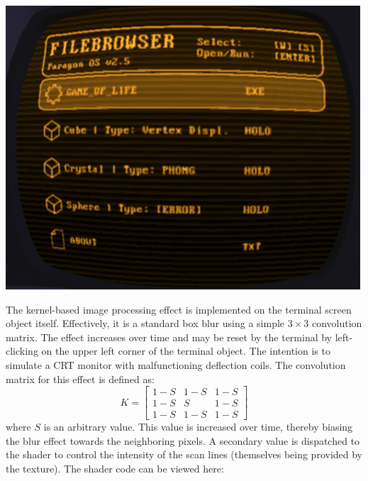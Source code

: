 \documentclass[11pt]{article}
\begin{document}
\begin{center}
	\includegraphics[width=0.5\linewidth]{screeneffect.png}
\end{center}
The kernel-based image processing effect is implemented on the terminal screen object itself. Effectively, it is a standard box blur using a simple $3 \times 3$ convolution matrix. The effect increases over time and may be reset by  the terminal by left-clicking on the upper left corner of the terminal object. The intention is to simulate a CRT monitor with malfunctioning deflection coils. The convolution matrix for this effect is defined as:
\[ K = \begin{bmatrix} 1-S & 1-S & 1-S \\ 1-S & S & 1-S \\ 1-S & 1-S & 1-S \end{bmatrix} \] where $S$ is an arbitrary  value. This value is increased over time, thereby biasing the blur effect towards the neighboring pixels. A secondary  value is dispatched to the shader to control the intensity of the scan lines (themselves being provided by the  texture). The shader code can be viewed here: 
\end{document}
